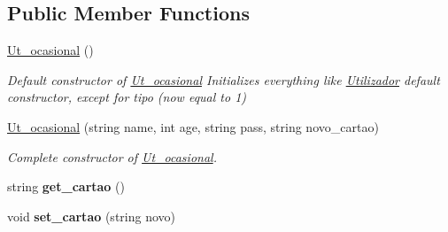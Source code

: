 \subsection*{Public Member Functions}
\begin{DoxyCompactItemize}
\item 
\hypertarget{class_ut__ocasional_ad26b95c8f79ed12f221da29f19896e82}{\hyperlink{class_ut__ocasional_ad26b95c8f79ed12f221da29f19896e82}{Ut\+\_\+ocasional} ()}\label{class_ut__ocasional_ad26b95c8f79ed12f221da29f19896e82}

\begin{DoxyCompactList}\small\item\em Default constructor of \hyperlink{class_ut__ocasional}{Ut\+\_\+ocasional} Initializes everything like \hyperlink{class_utilizador}{Utilizador} default constructor, except for tipo (now equal to 1) \end{DoxyCompactList}\item 
\hypertarget{class_ut__ocasional_acf3a4c7d6ef3d9000c6284a93201d4b1}{\hyperlink{class_ut__ocasional_acf3a4c7d6ef3d9000c6284a93201d4b1}{Ut\+\_\+ocasional} (string name, int age, string pass, string novo\+\_\+cartao)}\label{class_ut__ocasional_acf3a4c7d6ef3d9000c6284a93201d4b1}

\begin{DoxyCompactList}\small\item\em Complete constructor of \hyperlink{class_ut__ocasional}{Ut\+\_\+ocasional}. \end{DoxyCompactList}\item 
\hypertarget{class_ut__ocasional_a5a455dacffda809dd8a383896174dd07}{string {\bfseries get\+\_\+cartao} ()}\label{class_ut__ocasional_a5a455dacffda809dd8a383896174dd07}

\item 
\hypertarget{class_ut__ocasional_a4c4005d41c818c737d56121ec9a79e19}{void {\bfseries set\+\_\+cartao} (string novo)}\label{class_ut__ocasional_a4c4005d41c818c737d56121ec9a79e19}


\end{DoxyCompactItemize}
